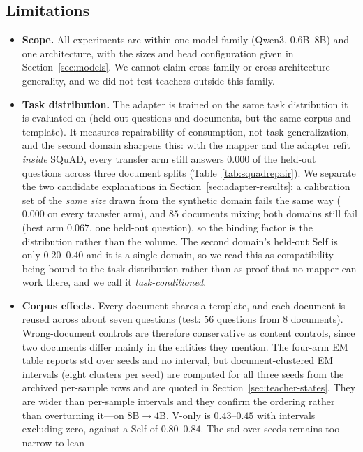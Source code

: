 \documentclass[11pt]{article}
\begin{document}
\subsection{Limitations}
\label{sec:limitations}
\begin{itemize}
\item \textbf{Scope.} All experiments are within one model family (Qwen3,
  $0.6$B--$8$B) and one architecture, with the sizes and head configuration given
  in Section~\ref{sec:models}. We cannot claim cross-family or cross-architecture generality,
  and we did not test teachers outside this family.
\item \textbf{Task distribution.} The adapter is trained on the same task
  distribution it is evaluated on (held-out questions and documents, but the same
  corpus and template). It measures repairability of consumption, not task
  generalization, and the second domain sharpens this: with the mapper and the
  adapter refit \emph{inside} SQuAD, every transfer arm still answers $0.000$ of
  the held-out questions across three document splits
  (Table~\ref{tab:squadrepair}). We separate the two candidate explanations in
  Section~\ref{sec:adapter-results}: a calibration set of the \emph{same size}
  drawn from the synthetic domain fails the same way ($0.000$ on every transfer
  arm), and $85$ documents mixing both domains still fail (best arm $0.067$, one
  held-out question), so the binding factor is the distribution rather than the
  volume. The second domain's held-out Self is only $0.20$--$0.40$ and it is a
  single domain, so we read this as compatibility being bound to the task
  distribution rather than as proof that no mapper can work there, and we call it
  \emph{task-conditioned}.
\item \textbf{Corpus effects.} Every document shares a template, and each
  document is reused across about seven questions (test: $56$ questions from $8$
  documents). Wrong-document controls are therefore conservative as content
  controls, since two documents differ mainly in the entities they mention. The
  four-arm EM table reports std over seeds and no interval, but document-clustered
  EM intervals (eight clusters per seed) are computed for all three seeds from the
  archived per-sample rows and are quoted in Section~\ref{sec:teacher-states}. They are wider than
  per-sample intervals and they confirm the ordering rather than overturning
  it---on $8$B$\to4$B, V-only is $0.43$--$0.45$ with intervals excluding zero,
  against a Self of $0.80$--$0.84$. The std over seeds remains too narrow to lean

\end{itemize}
\end{document}
